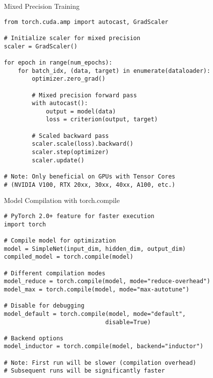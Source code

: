 \documentclass[aspectratio=169,10pt]{beamer}
\begin{document}
\begin{frame}[fragile]{Mixed Precision Training}
\begin{lstlisting}
from torch.cuda.amp import autocast, GradScaler

# Initialize scaler for mixed precision
scaler = GradScaler()

for epoch in range(num_epochs):
    for batch_idx, (data, target) in enumerate(dataloader):
        optimizer.zero_grad()
        
        # Mixed precision forward pass
        with autocast():
            output = model(data)
            loss = criterion(output, target)
        
        # Scaled backward pass
        scaler.scale(loss).backward()
        scaler.step(optimizer)
        scaler.update()

# Note: Only beneficial on GPUs with Tensor Cores
# (NVIDIA V100, RTX 20xx, 30xx, 40xx, A100, etc.)
\end{lstlisting}
\end{frame}

\begin{frame}[fragile]{Model Compilation with torch.compile}
\begin{lstlisting}
# PyTorch 2.0+ feature for faster execution
import torch

# Compile model for optimization
model = SimpleNet(input_dim, hidden_dim, output_dim)
compiled_model = torch.compile(model)

# Different compilation modes
model_reduce = torch.compile(model, mode="reduce-overhead")
model_max = torch.compile(model, mode="max-autotune")

# Disable for debugging
model_default = torch.compile(model, mode="default",
                             disable=True)

# Backend options
model_inductor = torch.compile(model, backend="inductor")

# Note: First run will be slower (compilation overhead)
# Subsequent runs will be significantly faster
\end{lstlisting}
\end{frame}
\end{document}

